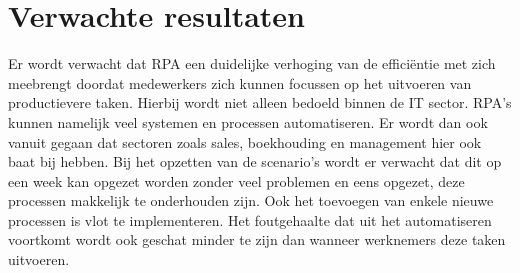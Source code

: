 \section{Verwachte resultaten}
\label{sec:verwachte_resultaten}
Er wordt verwacht dat RPA een duidelijke verhoging van de efficiëntie met zich meebrengt doordat medewerkers zich kunnen focussen op het uitvoeren van productievere taken. Hierbij wordt niet alleen bedoeld binnen de IT sector. RPA's kunnen namelijk veel systemen en processen automatiseren. Er wordt dan ook vanuit gegaan dat sectoren zoals sales, boekhouding en management hier ook baat bij hebben. Bij het opzetten van de scenario's wordt er verwacht dat dit op een week kan opgezet worden zonder veel problemen en eens opgezet, deze processen makkelijk te onderhouden zijn. Ook het toevoegen van enkele nieuwe processen is vlot te implementeren. Het foutgehaalte dat uit het automatiseren voortkomt wordt ook geschat minder te zijn dan wanneer werknemers deze taken uitvoeren.

